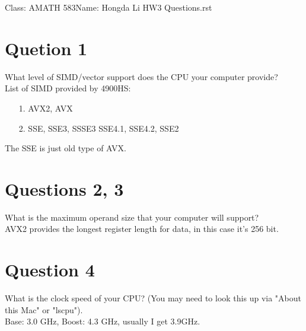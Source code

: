 \documentclass[]{article}
\begin{document}
\begin{center}
    Class: AMATH 583\quad Name: Hongda Li \quad HW3 Questions.rst
\end{center}
\section*{Quetion 1}
    What level of SIMD/vector support does the CPU your computer provide?
    \\[1.1em]
    List of SIMD provided by 4900HS:
    \begin{enumerate}
    \item[1.] AVX2, AVX
    \item[2.] SSE, SSE3, SSSE3 SSE4.1, SSE4.2, SSE2 
    \end{enumerate}
    The SSE is just old type of AVX.
    
\section*{Questions 2, 3}
    What is the maximum operand size that your computer will support?
    \\[1.1em]
    AVX2 provides the longest register length for data, in this case it's 256 bit.


\section*{Question 4}
    What is the clock speed of your CPU?  (You may need to look this up via "About this Mac" or "lscpu").
    \\
    Base: 3.0 GHz, Boost: 4.3 GHz, usually I get 3.9GHz. 
\end{document}
